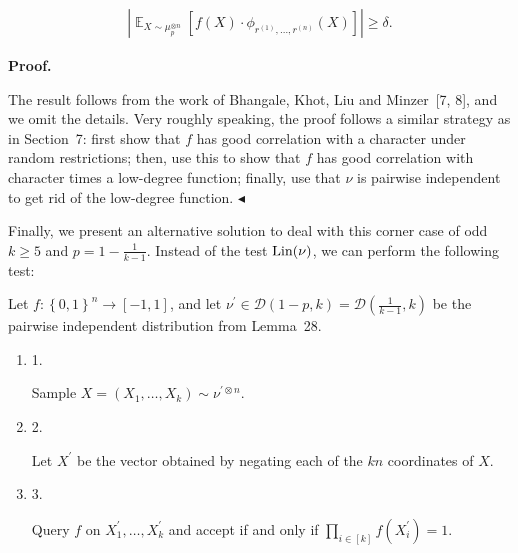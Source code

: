 \documentclass[10pt,a4paper]{article}
\begin{document}
\[\begin{gathered}
\left|\mathop{\mathbb{E}}_{X\sim\mu_{p}^{\otimes n}}\left[f(X)\cdot\phi_{r^{\left(1\right)},\dots,r^{\left(n\right)}}(X)\right]\right|\geqslant\delta.
\end{gathered}\]






\par\medskip\noindent\textbf{Proof.}\par




The result follows from the work of Bhangale, Khot, Liu and Minzer [7, 8], and we omit the details.
Very roughly speaking, the proof follows a similar strategy as in Section 7: first show that $f$ has good correlation with a character under random restrictions; then, use this to show that $f$ has good correlation with character times a low-degree function; finally, use that $\nu$ is pairwise independent to get rid of the low-degree function.
$\blacktriangleleft$\par




Finally, we present an alternative solution to deal with this corner case of odd $k\geqslant 5$ and $p=1-\frac{1}{k-1}$.
Instead of the test $\textnormal{Lin}(\nu)$, we can perform the following test:\par




Let $f:\left\{0,1\right\}^{n}\to[-1,1]$, and let $\nu^{\prime}\in\mathcal{D}(1-p,k)=\mathcal{D}(\frac{1}{k-1},k)$ be the pairwise independent distribution from Lemma 28.\par


\begin{enumerate}


\item[] 
1. 


Sample $X=(X_{1},\dots,X_{k})\sim\nu^{\prime\otimes n}$.\par





\item[] 
2. 


Let $X^{\prime}$ be the vector obtained by negating each of the $kn$ coordinates of $X$.\par





\item[] 
3. 


Query $f$ on $X^{\prime}_{1},\dots,X^{\prime}_{k}$ and accept if and only if $\prod_{i\in[k]}f(X^{\prime}_{i})=1$.\par





\end{enumerate}
\end{document}
